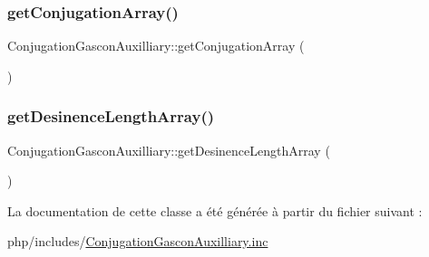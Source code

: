\subsubsection{\texorpdfstring{get\+Conjugation\+Array()}{getConjugationArray()}}
{\footnotesize\ttfamily Conjugation\+Gascon\+Auxilliary\+::get\+Conjugation\+Array (\begin{DoxyParamCaption}{ }\end{DoxyParamCaption})}

\hypertarget{class_conjugation_gascon_auxilliary_aee22cc89619cf7a697b30f2b2ab0eb73}{}\label{class_conjugation_gascon_auxilliary_aee22cc89619cf7a697b30f2b2ab0eb73} 
\subsubsection{\texorpdfstring{get\+Desinence\+Length\+Array()}{getDesinenceLengthArray()}}
{\footnotesize\ttfamily Conjugation\+Gascon\+Auxilliary\+::get\+Desinence\+Length\+Array (\begin{DoxyParamCaption}{ }\end{DoxyParamCaption})\hspace{0.3cm}{\ttfamily [protected]}}



La documentation de cette classe a été générée à partir du fichier suivant \+:\begin{DoxyCompactItemize}
\item 
php/includes/\hyperlink{_conjugation_gascon_auxilliary_8inc}{Conjugation\+Gascon\+Auxilliary.\+inc}\end{DoxyCompactItemize}
